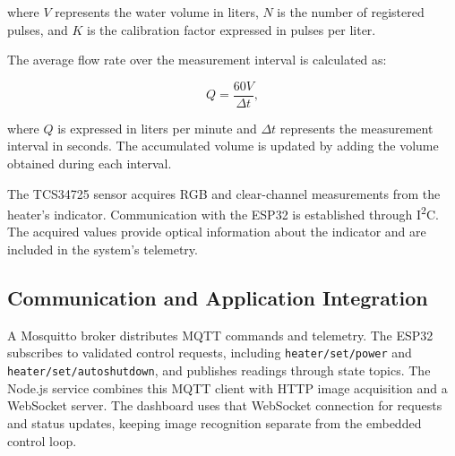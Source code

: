 where $V$ represents the water volume in liters, $N$ is the number of registered pulses, and $K$ is the calibration factor
expressed in pulses per liter.

The average flow rate over the measurement interval is calculated as:

\begin{equation}
    Q = \frac{60V}{\Delta t},
    \label{eq:flow-rate}
\end{equation}

where $Q$ is expressed in liters per minute and $\Delta t$ represents the measurement interval in seconds.
The accumulated volume is updated by adding the volume obtained during each interval.

The TCS34725 sensor acquires RGB and clear-channel measurements from the heater's indicator.
Communication with the ESP32 is established through I\textsuperscript{2}C.
The acquired values provide optical information about the indicator and are included in the system's telemetry.

\subsection{Communication and Application Integration}
A Mosquitto broker distributes MQTT commands and telemetry. The ESP32 subscribes to validated control requests, including \texttt{heater/set/power} and \texttt{heater/set/autoshutdown}, and publishes readings through state topics. The Node.js service combines this MQTT client with HTTP image acquisition and a WebSocket server. The dashboard uses that WebSocket connection for requests and status updates, keeping image recognition separate from the embedded control loop.
